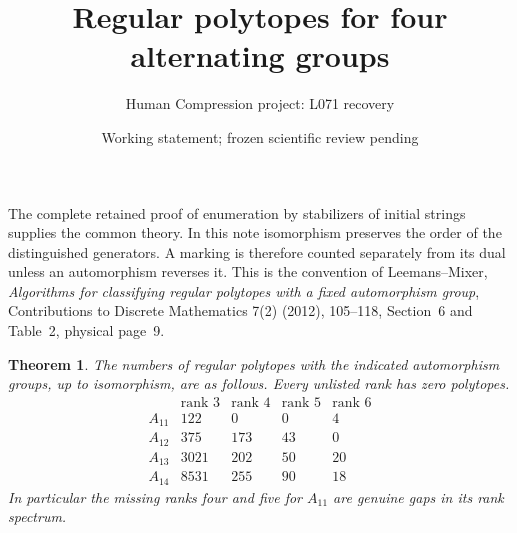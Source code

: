 \documentclass[11pt,a4paper]{article}
\title{Regular polytopes for four alternating groups}
\author{Human Compression project: L071 recovery}
\date{Working statement; frozen scientific review pending}
\newtheorem{theorem}{Theorem}
\begin{document}
\maketitle
The complete retained proof of enumeration by stabilizers of initial
strings supplies the common theory. In this note isomorphism preserves
the order of the distinguished generators. A marking is therefore
counted separately from its dual unless an automorphism reverses it.
This is the convention of Leemans--Mixer, \emph{Algorithms for
classifying regular polytopes with a fixed automorphism group},
Contributions to Discrete Mathematics 7(2) (2012), 105--118,
Section~6 and Table~2, physical page~9.

\begin{theorem}
The numbers of regular polytopes with the indicated automorphism
groups, up to isomorphism, are as follows. Every unlisted rank has
zero polytopes.
\[
\begin{array}{c|rrrr}
 &\text{rank }3&\text{rank }4&\text{rank }5&\text{rank }6\\\hline
 A_{11}&122&0&0&4\\
 A_{12}&375&173&43&0\\
 A_{13}&3021&202&50&20\\
 A_{14}&8531&255&90&18
\end{array}
\]
In particular the missing ranks four and five for $A_{11}$ are genuine
gaps in its rank spectrum.
\end{theorem}
\end{document}
